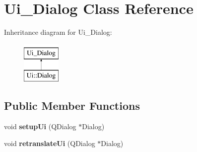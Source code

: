 \hypertarget{classUi__Dialog}{\section{Ui\-\_\-\-Dialog Class Reference}
\label{classUi__Dialog}
}
Inheritance diagram for Ui\-\_\-\-Dialog\-:\begin{figure}[H]
\begin{center}
\leavevmode
\includegraphics[height=2.000000cm]{classUi__Dialog}
\end{center}
\end{figure}
\subsection*{Public Member Functions}
\begin{DoxyCompactItemize}
\item 
\hypertarget{classUi__Dialog_a4f6a478c3ecdafabffb17b39cb26444a}{void {\bfseries setup\-Ui} (Q\-Dialog $\ast$Dialog)}\label{classUi__Dialog_a4f6a478c3ecdafabffb17b39cb26444a}

\item 
\hypertarget{classUi__Dialog_afa0ccb6f716ca6178260522a193c250e}{void {\bfseries retranslate\-Ui} (Q\-Dialog $\ast$Dialog)}\label{classUi__Dialog_afa0ccb6f716ca6178260522a193c250e}

\end{DoxyCompactItemize}
